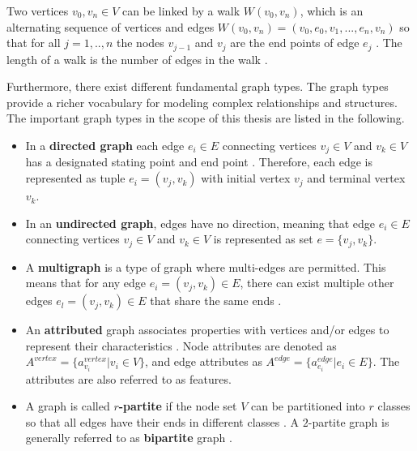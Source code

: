 Two vertices $v_0, v_n \in V$ can be linked by a walk $W(v_0, v_n)$, which is an alternating sequence of vertices and edges $W(v_0, v_n)=(v_0, e_0, v_1, ..., e_n, v_n)$ so that for all $j=1,..,n$ the nodes $v_{j-1}$ and $v_j$ are the end points of edge $e_j$ \cite{diestel_graph_2017}. The length of a walk is the number of edges in the walk \cite{diestel_graph_2017}.

Furthermore, there exist different fundamental graph types. The graph types provide a richer vocabulary for modeling complex relationships and structures. The important graph types in the scope of this thesis are listed in the following.

\vspace{1.5cm}

\begin{itemize}
    \item In a \textbf{directed graph} each edge $e_i \in E$ connecting vertices $v_j \in V$ and $v_k \in V$ has a designated stating point and end point \cite{diestel_graph_2017}. Therefore, each edge is represented as tuple $e_i = (v_j, v_k)$ with initial vertex $v_j$ and terminal vertex $v_k$. 
    
    \item In an \textbf{undirected graph}, edges have no direction, meaning that edge $e_i \in E$ connecting vertices $v_j \in V$ and $v_k \in V$ is represented as set $e = \{v_j, v_k\}$.
    
    \item A \textbf{multigraph} is a type of graph where multi-edges are permitted. This means that for any edge $e_i = (v_j,v_k) \in E$, there can exist multiple other edges $e_l = (v_j,v_k) \in E$ that share the same ends \cite{kazemi_representation_2019}.
    
    \item An \textbf{attributed} graph associates properties with vertices and/or edges to represent their characteristics \cite{kazemi_representation_2019}. Node attributes are denoted as $A^{vertex} = \{a^{vertex}_{v_i} | v_i \in V\}$, and edge attributes as $A^{edge} = \{a^{edge}_{e_i} | e_i \in E\}$. The attributes are also referred to as features.
    
    \item A graph is called \textbf{$r$-partite} if the node set $V$ can be partitioned into $r$ classes so that all edges have their ends in different classes \cite{diestel_graph_2017}. A $2$-partite graph is generally referred to as \textbf{bipartite} graph \cite{diestel_graph_2017}.
\end{itemize}

